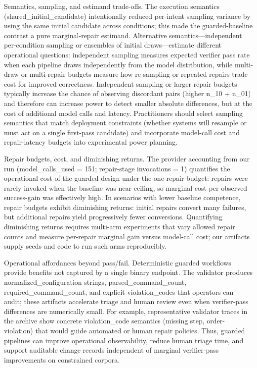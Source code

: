 \documentclass[conference]{IEEEtran}
\begin{document}
Semantics, sampling, and estimand trade-offs. The execution semantics (shared\_initial\_candidate) intentionally reduced per-intent sampling variance by using the same initial candidate across conditions; this made the guarded-baseline contrast a pure marginal-repair estimand. Alternative semantics---independent per-condition sampling or ensembles of initial draws---estimate different operational questions: independent sampling measures expected verifier pass rate when each pipeline draws independently from the model distribution, while multi-draw or multi-repair budgets measure how re-sampling or repeated repairs trade cost for improved correctness. Independent sampling or larger repair budgets typically increase the chance of observing discordant pairs (higher n\_10 + n\_01) and therefore can increase power to detect smaller absolute differences, but at the cost of additional model calls and latency. Practitioners should select sampling semantics that match deployment constraints (whether systems will resample or must act on a single first-pass candidate) and incorporate model-call cost and repair-latency budgets into experimental power planning.

Repair budgets, cost, and diminishing returns. The provider accounting from our run (model\_calls\_used = 151; repair-stage invocations = 1) quantifies the operational cost of the guarded design under the one-repair budget: repairs were rarely invoked when the baseline was near-ceiling, so marginal cost per observed success-gain was effectively high. In scenarios with lower baseline competence, repair budgets exhibit diminishing returns: initial repairs convert many failures, but additional repairs yield progressively fewer conversions. Quantifying diminishing returns requires multi-arm experiments that vary allowed repair counts and measure per-repair marginal gain versus model-call cost; our artifacts supply seeds and code to run such arms reproducibly.

Operational affordances beyond pass/fail. Deterministic guarded workflows provide benefits not captured by a single binary endpoint. The validator produces normalized\_configuration strings, parsed\_command\_count, required\_command\_count, and explicit violation\_codes that operators can audit; these artifacts accelerate triage and human review even when verifier-pass differences are numerically small. For example, representative validator traces in the archive show concrete violation\_code semantics (missing step, order-violation) that would guide automated or human repair policies. Thus, guarded pipelines can improve operational observability, reduce human triage time, and support auditable change records independent of marginal verifier-pass improvements on constrained corpora.
\end{document}

